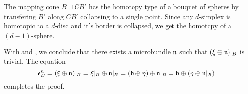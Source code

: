 \begin{myproof}
\begin{enumerate}
        The mapping cone $B \sqcup CB'$ has the homotopy type of a bouquet of spheres
        by transfering $B'$ along $CB'$ collapsing to a single point.
        Since any $d$-simplex is homotopic to a $d$-disc and it's border is collapsed, we get the homotopy of a $(d - 1)$-sphere.
        
        With  and ,
        we conclude that there exists a microbundle $\mathfrak{n}$ such that $(\xi \oplus{} \mathfrak{n})\vert_{B}$ is trivial.
        The equation
        \[
            \mathfrak{e}^{n}_{B}
            = (\xi \oplus{} \mathfrak{n})\vert_{B}
            = \xi\vert_{B} \oplus{} \mathfrak{n}\vert_{B}
            = (\mathfrak{b} \oplus{} \eta) \oplus{} \mathfrak{n}\vert_{B}
            = \mathfrak{b} \oplus{} (\eta \oplus{} \mathfrak{n}\vert_{B})
        \]
        completes the proof.
    \end{enumerate}
\end{myproof}